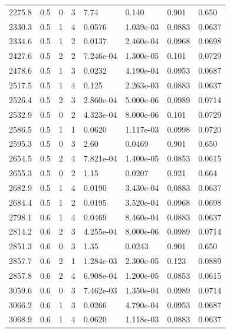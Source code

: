 \documentclass[preview]{standalone}
\begin{document}
{{{\begin{tabular}{L{1.2cm}C{1.2cm} C{0.3cm}C{0.5cm} C{1.4cm}C{1.4cm} C{1.4cm}C{1.4cm}}
  2275.8  &   0.5  & 0     &  3 &  7.74  & 0.140  & 0.901 &  0.650   \\ 
  2330.3  &   0.5  & 1     &  4 &  0.0576  & 1.039e-03  & 0.0883 &  0.0637   \\ 
  2334.6  &   0.5  & 1     &  2 &  0.0137  & 2.460e-04  & 0.0968 &  0.0698   \\ 
  2427.6  &   0.5  & 2     &  2 &  7.246e-04  & 1.300e-05  & 0.101 &  0.0729   \\ 
  2478.6  &   0.5  & 1     &  3 &  0.0232  & 4.190e-04  & 0.0953 &  0.0687   \\ 
  2517.5  &   0.5  & 1     &  4 &  0.125  & 2.263e-03  & 0.0883 &  0.0637   \\ 
  2526.4  &   0.5  & 2     &  3 &  2.860e-04  & 5.000e-06  & 0.0989 &  0.0714   \\ 
  2532.9  &   0.5  & 0     &  2 &  4.323e-04  & 8.000e-06  & 0.101 &  0.0729   \\ 
  2586.5  &   0.5  & 1     &  1 &  0.0620  & 1.117e-03  & 0.0998 &  0.0720   \\ 
  2595.3  &   0.5  & 0     &  3 &  2.60  & 0.0469  & 0.901 &  0.650   \\ 
  2654.5  &   0.5  & 2     &  4 &  7.821e-04  & 1.400e-05  & 0.0853 &  0.0615   \\ 
  2655.3  &   0.5  & 0     &  2 &  1.15  & 0.0207  & 0.921 &  0.664   \\ 
  2682.9  &   0.5  & 1     &  4 &  0.0190  & 3.430e-04  & 0.0883 &  0.0637   \\ 
  2684.4  &   0.5  & 1     &  2 &  0.0195  & 3.520e-04  & 0.0968 &  0.0698   \\ 
  2798.1  &   0.6  & 1     &  4 &  0.0469  & 8.460e-04  & 0.0883 &  0.0637   \\ 
  2814.2  &   0.6  & 2     &  3 &  4.255e-04  & 8.000e-06  & 0.0989 &  0.0714   \\ 
  2851.3  &   0.6  & 0     &  3 &  1.35  & 0.0243  & 0.901 &  0.650   \\ 
  2857.7  &   0.6  & 2     &  1 &  1.284e-03  & 2.300e-05  & 0.123 &  0.0889   \\ 
  2857.8  &   0.6  & 2     &  4 &  6.908e-04  & 1.200e-05  & 0.0853 &  0.0615   \\ 
  3059.6  &   0.6  & 0     &  3 &  7.462e-03  & 1.350e-04  & 0.0989 &  0.0714   \\ 
  3066.2  &   0.6  & 1     &  3 &  0.0266  & 4.790e-04  & 0.0953 &  0.0687   \\ 
  3068.9  &   0.6  & 1     &  4 &  0.0620  & 1.118e-03  & 0.0883 &  0.0637   \\ 

\end{tabular}}}}
\end{document}
